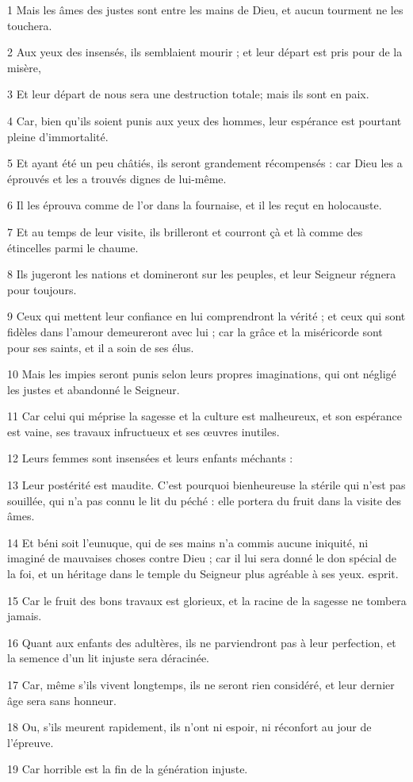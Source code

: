\par 1 Mais les âmes des justes sont entre les mains de Dieu, et aucun tourment ne les touchera.
\par 2 Aux yeux des insensés, ils semblaient mourir ; et leur départ est pris pour de la misère,
\par 3 Et leur départ de nous sera une destruction totale; mais ils sont en paix.
\par 4 Car, bien qu'ils soient punis aux yeux des hommes, leur espérance est pourtant pleine d'immortalité.
\par 5 Et ayant été un peu châtiés, ils seront grandement récompensés : car Dieu les a éprouvés et les a trouvés dignes de lui-même.
\par 6 Il les éprouva comme de l'or dans la fournaise, et il les reçut en holocauste.
\par 7 Et au temps de leur visite, ils brilleront et courront çà et là comme des étincelles parmi le chaume.
\par 8 Ils jugeront les nations et domineront sur les peuples, et leur Seigneur régnera pour toujours.
\par 9 Ceux qui mettent leur confiance en lui comprendront la vérité ; et ceux qui sont fidèles dans l'amour demeureront avec lui ; car la grâce et la miséricorde sont pour ses saints, et il a soin de ses élus.
\par 10 Mais les impies seront punis selon leurs propres imaginations, qui ont négligé les justes et abandonné le Seigneur.
\par 11 Car celui qui méprise la sagesse et la culture est malheureux, et son espérance est vaine, ses travaux infructueux et ses œuvres inutiles.
\par 12 Leurs femmes sont insensées et leurs enfants méchants :
\par 13 Leur postérité est maudite. C'est pourquoi bienheureuse la stérile qui n'est pas souillée, qui n'a pas connu le lit du péché : elle portera du fruit dans la visite des âmes.
\par 14 Et béni soit l'eunuque, qui de ses mains n'a commis aucune iniquité, ni imaginé de mauvaises choses contre Dieu ; car il lui sera donné le don spécial de la foi, et un héritage dans le temple du Seigneur plus agréable à ses yeux. esprit.
\par 15 Car le fruit des bons travaux est glorieux, et la racine de la sagesse ne tombera jamais.
\par 16 Quant aux enfants des adultères, ils ne parviendront pas à leur perfection, et la semence d'un lit injuste sera déracinée.
\par 17 Car, même s'ils vivent longtemps, ils ne seront rien considéré, et leur dernier âge sera sans honneur.
\par 18 Ou, s'ils meurent rapidement, ils n'ont ni espoir, ni réconfort au jour de l'épreuve.
\par 19 Car horrible est la fin de la génération injuste.

